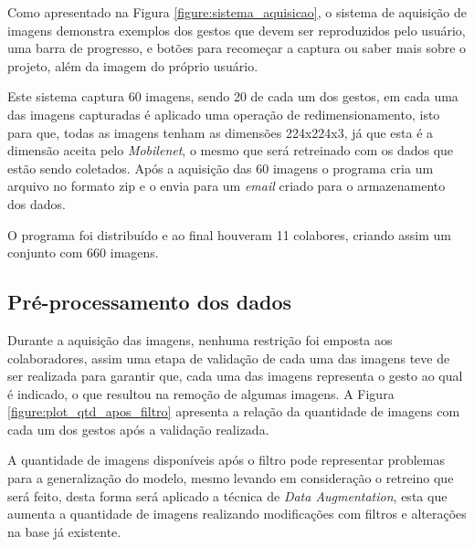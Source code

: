 
\par Como apresentado na Figura \ref{figure:sistema_aquisicao}, o sistema de aquisição de imagens demonstra exemplos dos gestos que devem ser reproduzidos pelo usuário, uma barra de progresso, e botões para recomeçar a captura ou saber mais sobre o projeto, além da imagem do próprio usuário.

\par Este sistema captura 60 imagens, sendo 20 de cada um dos gestos, em cada uma das imagens capturadas é aplicado uma operação de redimensionamento, isto para que, todas as imagens tenham as dimensões 224x224x3, já que esta é a dimensão aceita pelo \textit{Mobilenet}, o mesmo que será retreinado com os dados que estão sendo coletados. Após a aquisição das 60 imagens o programa cria um arquivo no formato zip e o envia para um \textit{email} criado para o armazenamento dos dados.

\par O programa foi distribuído e ao final houveram 11 colabores, criando assim um conjunto com 660 imagens.

\subsection{Pré-processamento dos dados} 

\par Durante a aquisição das imagens, nenhuma restrição foi emposta aos colaboradores, assim uma etapa de validação de cada uma das imagens teve de ser realizada para garantir que, cada uma das imagens representa o gesto ao qual é indicado, o que resultou na remoção de algumas imagens. A Figura \ref{figure:plot_qtd_apos_filtro} apresenta a relação da quantidade de imagens com cada um dos gestos após a validação realizada.


\par A quantidade de imagens disponíveis após o filtro pode representar problemas para a generalização do modelo, mesmo levando em consideração o retreino que será feito, desta forma será aplicado a técnica de \textit{Data Augmentation}, esta que aumenta a quantidade de imagens realizando modificações com filtros e alterações na base já existente.

